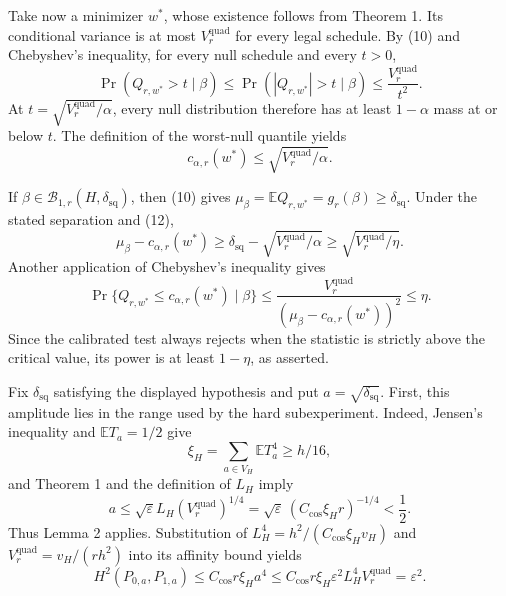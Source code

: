 Take now a minimizer \(w^*\), whose existence follows from Theorem 1.  Its conditional variance is at most \(V_r^{\mathrm{quad}}\) for every legal schedule.  By (10) and Chebyshev's inequality, for every null schedule and every \(t>0\),
\[
\Pr(Q_{r,w^*}>t\mid\beta)
\le\Pr(|Q_{r,w^*}|>t\mid\beta)
\le\frac{V_r^{\mathrm{quad}}}{t^2}.
\]
At \(t=\sqrt{V_r^{\mathrm{quad}}/\alpha}\), every null distribution therefore has at least \(1-\alpha\) mass at or below \(t\).  The definition of the worst-null quantile yields
\[
c_{\alpha,r}(w^*)\le\sqrt{V_r^{\mathrm{quad}}/\alpha}. \tag{12}
\]

If \(\beta\in\mathcal B_{1,r}(H,\delta_{\mathrm{sq}})\), then (10) gives \(\mu_\beta=\mathbb E Q_{r,w^*}=g_r(\beta)\ge\delta_{\mathrm{sq}}\).  Under the stated separation and (12),
\[
\mu_\beta-c_{\alpha,r}(w^*)
\ge\delta_{\mathrm{sq}}-\sqrt{V_r^{\mathrm{quad}}/\alpha}
\ge\sqrt{V_r^{\mathrm{quad}}/\eta}.
\]
Another application of Chebyshev's inequality gives
\[
\Pr\{Q_{r,w^*}\le c_{\alpha,r}(w^*)\mid\beta\}
\le\frac{V_r^{\mathrm{quad}}}{(\mu_\beta-c_{\alpha,r}(w^*))^2}\le\eta.
\]
Since the calibrated test always rejects when the statistic is strictly above the critical value, its power is at least \(1-\eta\), as asserted.

Fix \(\delta_{\mathrm{sq}}\) satisfying the displayed hypothesis and put \(a=\sqrt{\delta_{\mathrm{sq}}}\).  First, this amplitude lies in the range used by the hard subexperiment.  Indeed, Jensen's inequality and \(\mathbb ET_a=1/2\) give
\[
\xi_H=\sum_{a\in V_H}\mathbb ET_a^4\ge h/16,
\]
and Theorem 1 and the definition of \(L_H\) imply
\[
a\le\sqrt\varepsilon L_H(V_r^{\mathrm{quad}})^{1/4}
=\sqrt\varepsilon\,(C_{\cos}\xi_Hr)^{-1/4}<\frac12.
\]
Thus Lemma 2 applies.  Substitution of \(L_H^4=h^2/(C_{\cos}\xi_Hv_H)\) and \(V_r^{\mathrm{quad}}=v_H/(rh^2)\) into its affinity bound yields
\[
H^2(P_{0,a},P_{1,a})
\le C_{\cos}r\xi_Ha^4
\le C_{\cos}r\xi_H\varepsilon^2L_H^4V_r^{\mathrm{quad}}
=\varepsilon^2. \tag{13}
\]


